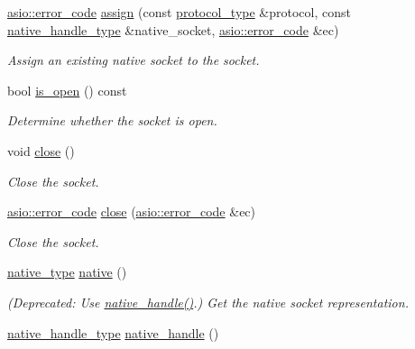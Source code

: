 \begin{DoxyCompactItemize}
\hyperlink{classasio_1_1error__code}{asio\+::error\+\_\+code} \hyperlink{classasio_1_1basic__socket_a8eb7313897c4531c917acf48d535f09c}{assign} (const \hyperlink{classasio_1_1basic__socket_a5890addc84762c67f2b3f1723428721d}{protocol\+\_\+type} \&protocol, const \hyperlink{classasio_1_1basic__socket_a3481ac06d51afa0cb23f09cd39ac64eb}{native\+\_\+handle\+\_\+type} \&native\+\_\+socket, \hyperlink{classasio_1_1error__code}{asio\+::error\+\_\+code} \&ec)
\begin{DoxyCompactList}\small\item\em Assign an existing native socket to the socket. \end{DoxyCompactList}\item 
bool \hyperlink{classasio_1_1basic__socket_aee6c284bed38af8723afc8463a037410}{is\+\_\+open} () const 
\begin{DoxyCompactList}\small\item\em Determine whether the socket is open. \end{DoxyCompactList}\item 
void \hyperlink{classasio_1_1basic__socket_aecb8346a5bc290e394a055b7d9164c0f}{close} ()
\begin{DoxyCompactList}\small\item\em Close the socket. \end{DoxyCompactList}\item 
\hyperlink{classasio_1_1error__code}{asio\+::error\+\_\+code} \hyperlink{classasio_1_1basic__socket_a3fa404892b34feff1f8e013ab7c3e7ee}{close} (\hyperlink{classasio_1_1error__code}{asio\+::error\+\_\+code} \&ec)
\begin{DoxyCompactList}\small\item\em Close the socket. \end{DoxyCompactList}\item 
\hyperlink{classasio_1_1basic__socket_a51a45a62e006c34758eff7a409f57eda}{native\+\_\+type} \hyperlink{classasio_1_1basic__socket_a9e65e3e73aa11b017d355d902e9b6ddc}{native} ()
\begin{DoxyCompactList}\small\item\em (Deprecated\+: Use \hyperlink{classasio_1_1basic__socket_a17d8c0572d17cc42adfde7d255b48306}{native\+\_\+handle()}.) Get the native socket representation. \end{DoxyCompactList}\item 
\hyperlink{classasio_1_1basic__socket_a3481ac06d51afa0cb23f09cd39ac64eb}{native\+\_\+handle\+\_\+type} \hyperlink{classasio_1_1basic__socket_a17d8c0572d17cc42adfde7d255b48306}{native\+\_\+handle} ()

\end{DoxyCompactItemize}
